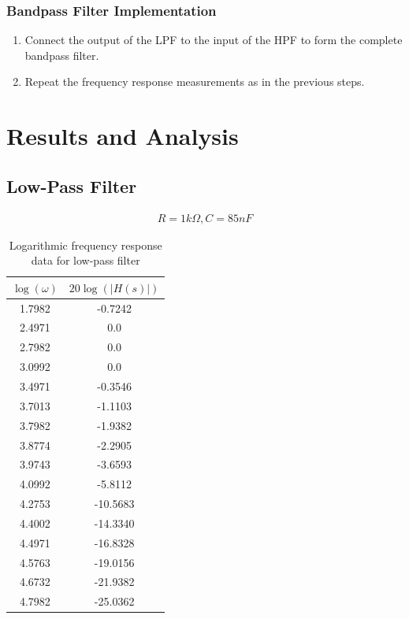 \documentclass[12pt]{article}
\begin{document}
\subsubsection{Bandpass Filter Implementation}
\begin{enumerate}
    \item Connect the output of the LPF to the input of the HPF to form the complete bandpass filter.
    \item Repeat the frequency response measurements as in the previous steps.
\end{enumerate}

\newpage
\section{Results and Analysis}
\subsection{Low-Pass Filter}

\begin{align*}
    R = 1k\Omega, C = 85nF
\end{align*}

\begin{table}[h]
\centering
\begin{tabular}{|c|c|}
\hline
$\log(\omega)$ & $20 \log(|H(s)|)$ \\
\hline
1.7982 & -0.7242 \\
2.4971 & 0.0 \\
2.7982 & 0.0 \\
3.0992 & 0.0 \\
3.4971 & -0.3546 \\
3.7013 & -1.1103 \\
3.7982 & -1.9382 \\
3.8774 & -2.2905 \\
3.9743 & -3.6593 \\
4.0992 & -5.8112 \\
4.2753 & -10.5683 \\
4.4002 & -14.3340 \\
4.4971 & -16.8328 \\
4.5763 & -19.0156 \\
4.6732 & -21.9382 \\
4.7982 & -25.0362 \\
\hline
\end{tabular}
\caption{Logarithmic frequency response data for low-pass filter}
\label{tab:freq_response}
\end{table}
\FloatBarrier
\end{document}
